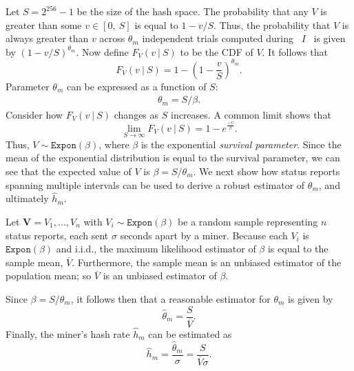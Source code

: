 \documentclass[10pt,sigconf]{acmart}
\newcommand{\para }[1]{\smallskip \noindent {\bf #1}}
\newcommand{\1}{{\em (i)}}
\newcommand{\2}{{\em (ii)}}
\newcommand{\3}{{\em (iii)}}
\newcommand{\4}{{\em (iv)}}
\newcommand{\5}{{\em (v)}}
\begin{document}
Let $S = 2^{256} -1$ be the size of the hash space. The probability
that any $V$ is greater than some $v \in [0, ~S]$ is equal to
$1 - v/S$. Thus, the probability that $V$ is always greater than $v$
across $\theta_m$ independent trials computed during ~$I$~ is given by
$(1-v/S)^{\theta_m}$. Now define $F_{V}(v~|~S)$ to be the CDF of $V$. It
follows that\vspace{-1em}
\begin{equation}
  F_{V}(v~|~S) = 1 - \left( 1 - \frac{v}{S} \right)^{\theta_m}.
\end{equation} 
Parameter $\theta_m$ can be expressed as a function of $S$:
\begin{align}
\theta_m = S / \beta.
\end{align}
Consider how $F_{V}(v~|~S)$ changes as $S$
increases. A common limit shows that
\begin{equation}
  \lim_{S \rightarrow \infty} F_{V}(v~|~S) = 1 - e^{\frac{-v}{\beta}}.
\end{equation}
Thus, $V \sim \texttt{Expon}(\beta)$, where $\beta$ is the exponential
\emph{survival parameter}. Since the mean of the exponential
distribution is equal to the survival parameter, we can see that the
expected value of $V$ is $\beta = S/\theta_m$.
We next show how status reports spanning multiple intervals can be
used to derive a robust estimator of $\theta_m$, and ultimately
$\hat{h}_m$.

\para{Estimator for hash rate.} Let $\textbf{V} = V_1, \ldots, V_{n}$
with $V_i \sim \texttt{Expon}(\beta)$ be a random sample representing
$n$ status reports, each sent $\sigma$ seconds apart by a
miner. Because each $V_i$ is $\texttt{Expon}(\beta)$ and i.i.d., the
maximum likelihood estimator of $\beta$ is equal to the sample mean,
$\overline{V}$. Furthermore, the sample mean is an unbiased estimator
of the population mean; so $\overline{V}$ is an unbiased estimator of
$\beta$.

Since $\beta = S/\theta_m$, it follows then that a reasonable
estimator for $\theta_m$ is given by\vspace{-1em}
\begin{equation}
\label{eq:theta_hat_m}
  \hat{\theta}_m = \frac{S}{\overline{V}}.
\end{equation}
Finally, the miner's hash rate $\hat{h}_m$ can be estimated as
\begin{equation}
\label{eqn:h_hat_m}
\hat{h}_m = \frac{\hat{\theta}_m}{\sigma} =  \frac{S}{\overline{V} \sigma}.
\end{equation}
\end{document}
